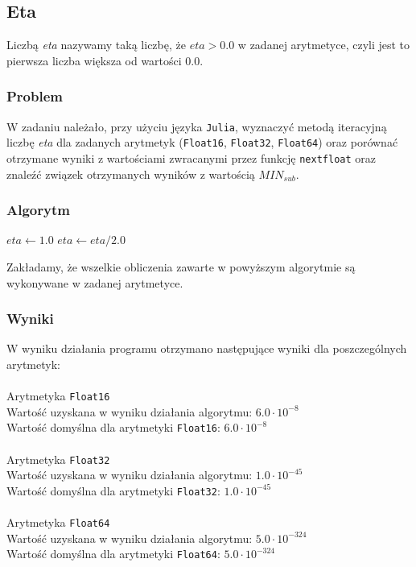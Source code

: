 \documentclass{article}
\begin{document}
\subsection{Eta}
Liczbą \textit{eta} nazywamy taką liczbę, że $eta > 0.0$ w zadanej arytmetyce, czyli jest to pierwsza liczba większa od wartości $0.0$.

\subsubsection{Problem}
W zadaniu należało, przy użyciu języka \texttt{Julia}, wyznaczyć metodą iteracyjną liczbę \textit{eta} dla zadanych arytmetyk (\texttt{Float16}, \texttt{Float32}, \texttt{Float64}) oraz porównać otrzymane wyniki z wartościami zwracanymi przez funkcję \texttt{nextfloat} oraz znaleźć związek otrzymanych wyników z wartością $MIN_{sub}$.

\subsubsection{Algorytm}
\begin{algorithm}
    \begin{algorithmic}[1]
            \State $eta \gets 1.0$
                \State $eta \gets eta / 2.0$
            \EndWhile
            \State {}
        \EndFunction
    \end{algorithmic}
\end{algorithm}
Zakładamy, że wszelkie obliczenia zawarte w powyższym algorytmie są wykonywane w zadanej arytmetyce.

\subsubsection{Wyniki}
W wyniku działania programu otrzymano następujące wyniki dla poszczególnych arytmetyk: \\\\
Arytmetyka \texttt{Float16} \\
Wartość uzyskana w wyniku działania algorytmu: $6.0 \cdot 10^{-8}$ \\
Wartość domyślna dla arytmetyki \texttt{Float16}: $6.0 \cdot 10^{-8}$ \\\\
Arytmetyka \texttt{Float32} \\
Wartość uzyskana w wyniku działania algorytmu: $1.0 \cdot 10^{-45}$ \\
Wartość domyślna dla arytmetyki \texttt{Float32}: $1.0 \cdot 10^{-45}$ \\\\
Arytmetyka \texttt{Float64} \\
Wartość uzyskana w wyniku działania algorytmu: $5.0 \cdot 10^{-324}$ \\
Wartość domyślna dla arytmetyki \texttt{Float64}: $5.0 \cdot 10^{-324}$ \\
\end{document}
